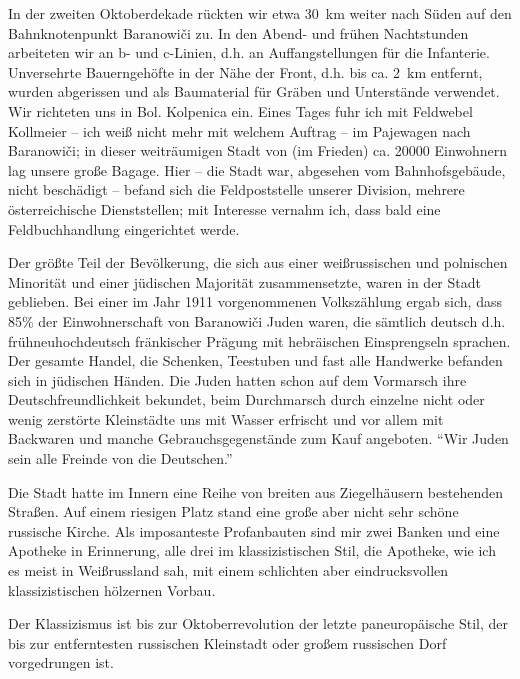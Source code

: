 In der zweiten Oktoberdekade rückten wir etwa 30~km weiter nach Süden auf den Bahnknotenpunkt Baranowiči zu. In den Abend- und frühen Nachtstunden arbeiteten wir an b- und c-Linien, d.h. an Auffangstellungen für die Infanterie. Unversehrte Bauerngehöfte in der Nähe der Front, d.h. bis ca. 2~km entfernt, wurden abgerissen und als Baumaterial für Gräben und Unterstände verwendet. Wir richteten uns in Bol. Kolpenica ein. Eines Tages fuhr ich mit Feldwebel Kollmeier -- ich weiß nicht mehr mit welchem Auftrag -- im Pajewagen nach Baranowiči; in dieser weiträumigen Stadt von (im Frieden) ca. \num{20000} Einwohnern lag unsere große Bagage. Hier -- die Stadt war, abgesehen vom Bahnhofsgebäude, nicht beschädigt -- befand sich die Feldpoststelle unserer Division, mehrere österreichische Dienststellen; mit Interesse vernahm ich, dass bald eine Feldbuchhandlung eingerichtet werde.

Der größte Teil der Bevölkerung, die sich aus einer weißrussischen und polnischen Minorität und einer jüdischen Majorität zusammensetzte, waren in der Stadt geblieben. Bei einer im Jahr 1911 vorgenommenen Volkszählung ergab sich, dass 85\% der Einwohnerschaft von Baranowiči Juden waren, die sämtlich deutsch d.h. frühneuhochdeutsch fränkischer Prägung mit hebräischen Einsprengseln sprachen. Der gesamte Handel, die Schenken, Teestuben und fast alle Handwerke befanden sich in jüdischen Händen. Die Juden hatten schon auf dem Vormarsch ihre Deutschfreundlichkeit bekundet, beim Durchmarsch durch einzelne nicht oder wenig zerstörte Kleinstädte uns mit Wasser erfrischt und vor allem mit Backwaren und manche Gebrauchsgegenstände zum Kauf angeboten. \enquote{Wir Juden sein alle Freinde von die Deutschen.}

Die Stadt hatte im Innern eine Reihe von breiten aus Ziegelhäusern bestehenden Straßen. Auf einem riesigen Platz stand eine große aber nicht sehr schöne russische Kirche. Als imposanteste Profanbauten sind mir zwei Banken und eine Apotheke in Erinnerung, alle drei im klassizistischen Stil, die Apotheke, wie ich es meist in Weißrussland sah, mit einem schlichten aber eindrucksvollen klassizistischen hölzernen Vorbau.

Der Klassizismus ist bis zur Oktoberrevolution der letzte paneuropäische Stil, der bis zur entferntesten russischen Kleinstadt oder großem russischen Dorf vorgedrungen ist.

